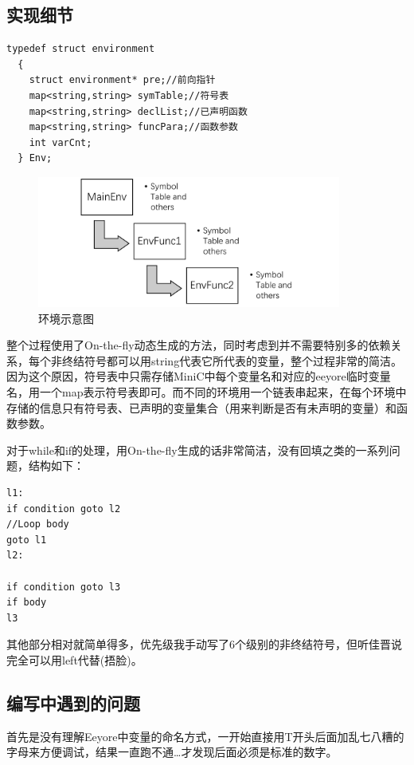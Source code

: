 \documentclass{ctexart}
\begin{document}
\subsection{实现细节}

\begin{lstlisting}[basicstyle=\listingsfont,caption={环境结构},captionpos=b]
typedef struct environment
  {
    struct environment* pre;//前向指针
    map<string,string> symTable;//符号表
    map<string,string> declList;//已声明函数
    map<string,string> funcPara;//函数参数
    int varCnt;
  } Env;
\end{lstlisting}

\begin{figure}[htbp]
  \centering\includegraphics[width=10cm]{latexIMG/MiniCEnv.png}
  \caption{环境示意图}
  \label{}
\end{figure}

整个过程使用了On-the-fly动态生成的方法，同时考虑到并不需要特别多的依赖关系，每个非终结符号都可以用string代表它所代表的变量，整个过程非常的简洁。因为这个原因，符号表中只需存储MiniC中每个变量名和对应的eeyore临时变量名，用一个map表示符号表即可。而不同的环境用一个链表串起来，在每个环境中存储的信息只有符号表、已声明的变量集合（用来判断是否有未声明的变量）和函数参数。

对于while和if的处理，用On-the-fly生成的话非常简洁，没有回填之类的一系列问题，结构如下：
\begin{lstlisting}[basicstyle=\listingsfont]
l1:
if condition goto l2
//Loop body
goto l1
l2:

if condition goto l3
if body
l3
\end{lstlisting}

其他部分相对就简单得多，优先级我手动写了6个级别的非终结符号，但听佳晋说完全可以用left代替(捂脸)。

\subsection{编写中遇到的问题}

首先是没有理解Eeyore中变量的命名方式，一开始直接用T开头后面加乱七八糟的字母来方便调试，结果一直跑不通…才发现后面必须是标准的数字。
\end{document}
